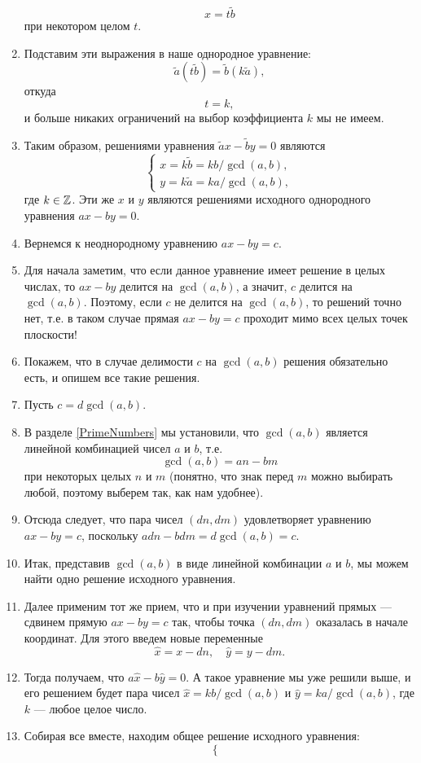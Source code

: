 \begin{enumerate}
$$
x=t\tilde b
$$
при некотором целом $t$.
\item Подставим эти выражения в наше однородное уравнение:
$$
\tilde a(t\tilde b)=\tilde b(k\tilde a),
$$
откуда
$$
t=k,
$$
и больше никаких ограничений на выбор коэффициента $k$ мы не имеем.
\item Таким образом, решениями уравнения $\tilde ax-\tilde by=0$ являются
$$
\begin{cases}
x  =k\tilde b=kb/\gcd(a,b), \\
y  =k\tilde a=ka/\gcd(a,b),
\end{cases}
$$
где $k\in\Z$. Эти же $x$ и $y$ являются решениями исходного однородного уравнения $ax-by=0$.
\item Вернемся к неоднородному уравнению $ax-by=c$.
\item Для начала заметим, что если данное уравнение имеет решение в целых числах, то $ax-by$ делится на $\gcd(a,b)$, а значит, $c$ делится на $\gcd(a,b)$. Поэтому, если $c$ не делится на $\gcd(a,b)$, то решений точно нет, т.е. в таком случае прямая $ax-by=c$ проходит мимо всех целых точек плоскости!
\item Покажем, что в случае делимости $c$ на $\gcd(a,b)$ решения обязательно есть, и опишем все такие решения.
\item Пусть $c=d\gcd(a,b)$.
\item В разделе \ref{PrimeNumbers} мы установили, что $\gcd(a,b)$ является линейной комбинацией чисел $a$ и $b$, т.е.
$$
\gcd(a,b) = an-bm
$$
при некоторых целых $n$ и $m$ (понятно, что знак перед $m$ можно выбирать любой, поэтому выберем так, как нам удобнее).
\item Отсюда следует, что пара чисел $(dn,dm)$ удовлетворяет уравнению $ax-by=c$, поскольку
$adn-bdm=d\gcd(a,b)=c$.
\item Итак, представив $\gcd(a,b)$ в виде линейной комбинации $a$ и $b$, мы можем найти одно решение исходного уравнения.
\item Далее применим тот же прием, что и при изучении уравнений прямых --- сдвинем прямую $ax-by=c$ так, чтобы точка $(dn,dm)$ оказалась в начале координат. Для этого введем новые переменные
$$
\hat x = x-dn,\quad \hat y = y-dm.
$$
\item Тогда получаем, что $a\hat x-b\hat y = 0$. А такое уравнение мы уже решили выше, и его решением будет пара чисел $\hat x = kb/\gcd(a,b)$ и $\hat y = ka/\gcd(a,b)$, где $k$ --- любое целое число.
\item Собирая все вместе, находим общее решение исходного уравнения:
$$
\begin{cases}

\end{cases}$$
\end{enumerate}
